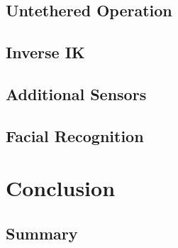 \documentclass{l4proj}
\begin{document}
\section{Untethered Operation}
\section{Inverse IK}
\section{Additional Sensors}
\section{Facial Recognition}


\chapter{Conclusion}


\section{Summary}





\end{document}
